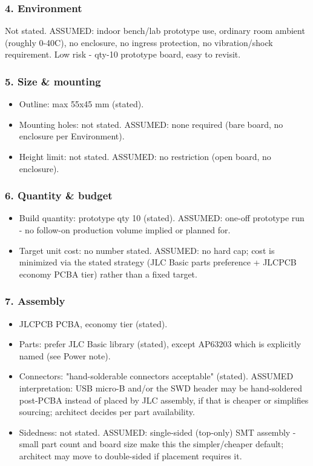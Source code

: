 \documentclass[11pt,a4paper]{article}
\begin{document}
\subsubsection*{4. Environment}
Not stated. ASSUMED: indoor bench/lab prototype use, ordinary room ambient (roughly 0-40C), no enclosure, no ingress protection, no vibration/shock requirement. Low risk - qty-10 prototype board, easy to revisit.

\subsubsection*{5. Size \& mounting}
\begin{itemize}
\item Outline: max 55x45 mm (stated).
\item Mounting holes: not stated. ASSUMED: none required (bare board, no
enclosure per Environment).
\item Height limit: not stated. ASSUMED: no restriction (open board, no
enclosure).
\end{itemize}
\subsubsection*{6. Quantity \& budget}
\begin{itemize}
\item Build quantity: prototype qty 10 (stated). ASSUMED: one-off prototype
run - no follow-on production volume implied or planned for.
\item Target unit cost: no number stated. ASSUMED: no hard cap; cost is
minimized via the stated strategy (JLC Basic parts preference + JLCPCB
economy PCBA tier) rather than a fixed target.
\end{itemize}
\subsubsection*{7. Assembly}
\begin{itemize}
\item JLCPCB PCBA, economy tier (stated).
\item Parts: prefer JLC Basic library (stated), except AP63203 which is
explicitly named (see Power note).
\item Connectors: "hand-solderable connectors acceptable" (stated). ASSUMED
interpretation: USB micro-B and/or the SWD header may be hand-soldered
post-PCBA instead of placed by JLC assembly, if that is cheaper or
simplifies sourcing; architect decides per part availability.
\item Sidedness: not stated. ASSUMED: single-sided (top-only) SMT assembly -
small part count and board size make this the simpler/cheaper default;
architect may move to double-sided if placement requires it.
\end{itemize}
\end{document}
